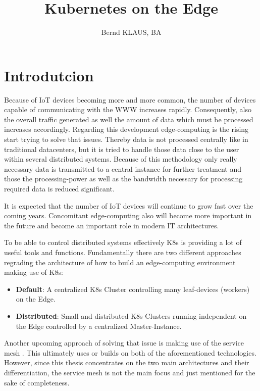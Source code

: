 \documentclass[MSC,Master,english]{twbook}%
\title{Kubernetes on the Edge}
\author{Bernd KLAUS, BA}
\begin{document}
\maketitle
\chapter{Introdutcion}
\label{chap:introduction}
Because of \ac{IoT} devices becoming more and more common, the number of devices capable of communicating with the \ac{WWW} increases rapidly. Consequently, also the overall traffic generated as well the amount of data which must be processed increases accordingly. Regarding this development edge-computing is the rising start trying to solve that issues. Thereby data is not processed centrally like in traditional datacenters, but it is tried to handle those data close to the user within several distributed systems. Because of this methodology only really necessary data is transmitted to a central instance for further treatment and those the processing-power as well as the bandwidth necessary for processing required data is reduced significant. \par It is expected that the number of IoT devices will continue to grow fast \cite{SotE21} over the coming years. Concomitant edge-computing also will become more important in the future and become an important role in modern \ac{IT} architectures. \par To be able to control distributed systems effectively \ac{K8s} is providing a lot of useful tools and functions. Fundamentally there are two different approaches regrading the architecture of how to build an edge-computing environment making use of \ac{K8s}:

\begin{itemize}
    \label{item:architecture}
    \item \textbf{Default}: A centralized \ac{K8s} Cluster controlling many leaf-devices (workers) on the Edge.
    \item \textbf{Distributed}: Small and distributed \ac{K8s} Clusters running independent on the Edge controlled by a centralized Master-Instance.
\end{itemize}

Another upcoming approach of solving that issue is making use of the service mesh \cite{servicemesh}. This ultimately uses or builds on both of the aforementioned technologies. However, since this thesis concentrates on the two main architectures and their differentiation, the service mesh is not the main focus and just mentioned for the sake of completeness.
\end{document}
